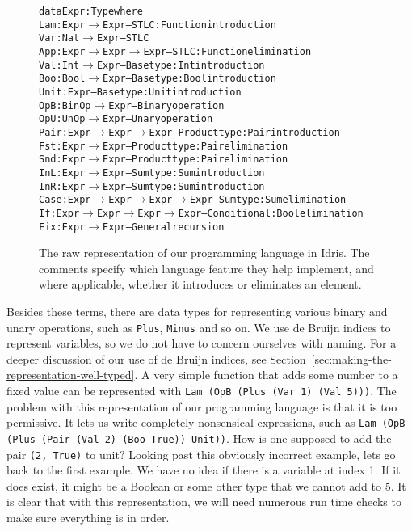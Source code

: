 \begin{center}
\begin{figure}
\begin{alltt}
data Expr : Type where
  Lam  : Expr \(\to\) Expr                 -- STLC: Function introduction
  Var  : Nat \(\to\) Expr                  -- STLC
  App  : Expr \(\to\) Expr \(\to\) Expr         -- STLC: Function elimination
  Val  : Int \(\to\) Expr                  -- Base type: Int introduction
  Boo  : Bool \(\to\) Expr                 -- Base type: Bool introduction
  Unit : Expr                         -- Base type: Unit introduction
  OpB  : BinOp \(\to\) Expr                -- Binary operation
  OpU  : UnOp \(\to\) Expr                 -- Unary operation
  Pair : Expr \(\to\) Expr \(\to\) Expr         -- Product type: Pair introduction
  Fst  : Expr \(\to\) Expr                 -- Product type: Pair elimination
  Snd  : Expr \(\to\) Expr                 -- Product type: Pair elimination
  InL  : Expr \(\to\) Expr                 -- Sum type: Sum introduction
  InR  : Expr \(\to\) Expr                 -- Sum type: Sum introduction
  Case : Expr \(\to\) Expr \(\to\) Expr \(\to\) Expr -- Sum type: Sum elimination
  If   : Expr \(\to\) Expr \(\to\) Expr \(\to\) Expr -- Conditional: Bool elimination
  Fix  : Expr \(\to\) Expr                 -- General recursion
\end{alltt}
\caption{The raw representation of our programming language in Idris. The comments specify which language feature they help implement, and where applicable, whether it introduces or eliminates an element.}
\label{fig:rstlc}
\end{figure}
\end{center}

Besides these terms, there are data types for representing various binary and unary operations, such as \texttt{Plus}, \texttt{Minus} and so on. We use de Bruijn indices to represent variables, so we do not have to concern ourselves with naming. For a deeper discussion of our use of de Bruijn indices, see Section~\ref{sec:making-the-representation-well-typed}. A very simple function that adds some number to a fixed value can be represented with \texttt{Lam (OpB (Plus (Var 1) (Val 5)))}. The problem with this representation of our programming language is that it is too permissive. It lets us write completely nonsensical expressions, such as \texttt{Lam (OpB (Plus (Pair (Val 2) (Boo True)) Unit))}. How is one supposed to add the pair \texttt{(2, True)} to unit? Looking past this obviously incorrect example, lets go back to the first example. We have no idea if there is a variable at index 1. If it does exist, it might be a Boolean or some other type that we cannot add to 5. It is clear that with this representation, we will need numerous run time checks to make sure everything is in order. 


